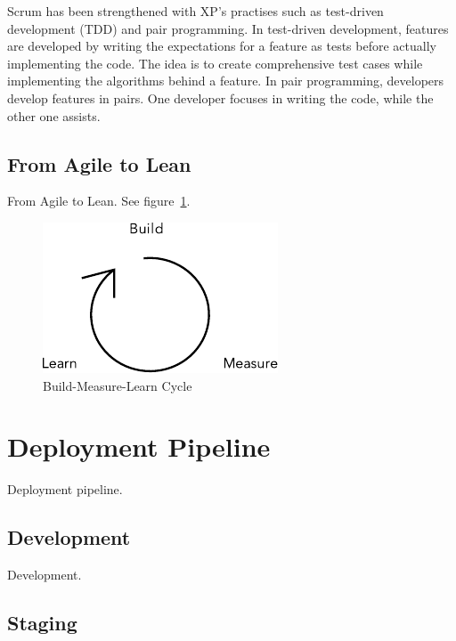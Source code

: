 \documentclass[english]{tktltiki2}
\begin{document}
Scrum has been strengthened with XP’s practises such as test-driven development (TDD) and pair programming. In test-driven development, features are developed by writing the expectations for a feature as tests before actually implementing the code. The idea is to create comprehensive test cases while implementing the algorithms behind a feature. In pair programming, developers develop features in pairs. One developer focuses in writing the code, while the other one assists.

\subsection{From Agile to Lean}

From Agile to Lean. See figure~\ref{figure:build-measure-learn}.

\begin{figure}[h!]

    \vspace{1cm}
    \centering

    \includegraphics{build-measure-learn}

    \caption{Build-Measure-Learn Cycle}
    \label{figure:build-measure-learn}

\end{figure}


\section{Deployment Pipeline}

Deployment pipeline.

\subsection{Development}

Development.

\subsection{Staging}
\end{document}
